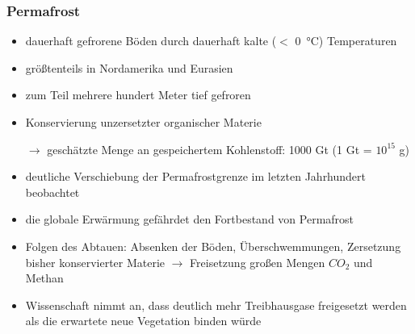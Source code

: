 \begin{frame}
	\frametitle{Permafrost}
	\begin{itemize}
		\item dauerhaft gefrorene Böden durch dauerhaft kalte ($<$ \SI{0}{\degreeCelsius}) Temperaturen
		\item größtenteils in Nordamerika und Eurasien
		\item zum Teil mehrere hundert Meter tief gefroren
		\item Konservierung unzersetzter organischer Materie
		\item [$\rightarrow$] geschätzte Menge an gespeichertem Kohlenstoff: 1000 Gt (1 Gt = $10^15$ g)
		\item deutliche Verschiebung der Permafrostgrenze im letzten Jahrhundert beobachtet
		\item die globale Erwärmung gefährdet den Fortbestand von Permafrost 
		\item Folgen des Abtauen: Absenken der Böden, Überschwemmungen, Zersetzung bisher konservierter Materie $\rightarrow$ Freisetzung großen Mengen $CO_2$ und Methan
		\item Wissenschaft nimmt an, dass deutlich mehr Treibhausgase freigesetzt werden als die erwartete neue Vegetation binden würde
	\end{itemize}

\end{frame}

